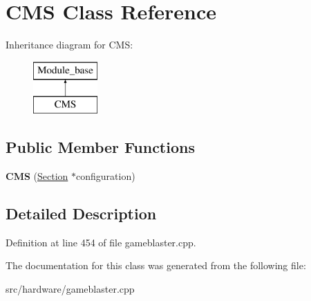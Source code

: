 \hypertarget{classCMS}{\section{C\-M\-S Class Reference}
\label{classCMS}
}
Inheritance diagram for C\-M\-S\-:\begin{figure}[H]
\begin{center}
\leavevmode
\includegraphics[height=2.000000cm]{classCMS}
\end{center}
\end{figure}
\subsection*{Public Member Functions}
\begin{DoxyCompactItemize}
\item 
\hypertarget{classCMS_afc0f43ea744137735477433ee764c729}{{\bfseries C\-M\-S} (\hyperlink{classSection}{Section} $\ast$configuration)}\label{classCMS_afc0f43ea744137735477433ee764c729}

\end{DoxyCompactItemize}


\subsection{Detailed Description}


Definition at line 454 of file gameblaster.\-cpp.



The documentation for this class was generated from the following file\-:\begin{DoxyCompactItemize}
\item 
src/hardware/gameblaster.\-cpp\end{DoxyCompactItemize}
